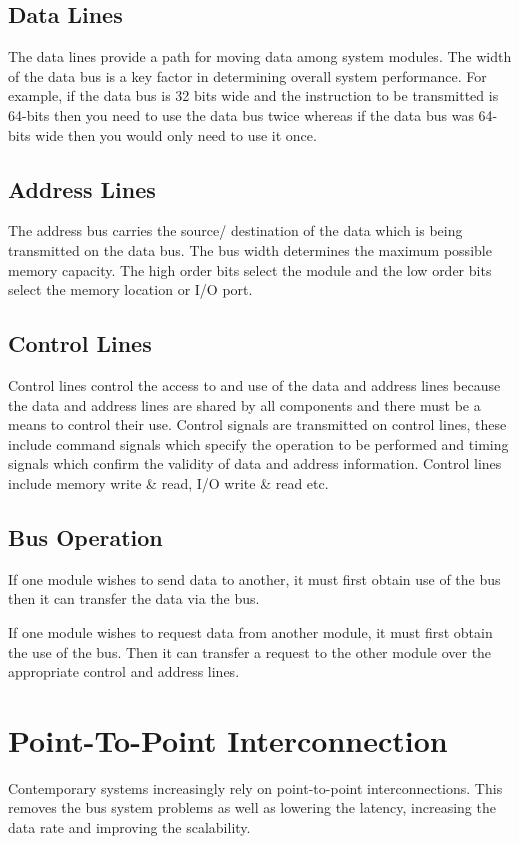 \subsection*{Data Lines}
The data lines provide a path for moving data among system modules. The width of the data bus is a key factor in determining overall system performance. For example, if the data bus is 32 bits wide and the instruction to be transmitted is 64-bits then you need to use the data bus twice whereas if the data bus was 64-bits wide then you would only need to use it once.

\subsection*{Address Lines}
The address bus carries the source/ destination of the data which is being transmitted on the data bus. The bus width determines the maximum possible memory capacity. The high order bits select the module and the low order bits select the memory location or I/O port.

\subsection*{Control Lines}
Control lines control the access to and use of the data and address lines because the data and address lines are shared by all components and there must be a means to control their use. Control signals are transmitted on control lines, these include command signals which specify the operation to be performed and timing signals which confirm the validity of data and address information. Control lines include memory write \& read, I/O write \& read etc.

\subsection*{Bus Operation}
If one module wishes to send data to another, it must first obtain use of the bus then it can transfer the data via the bus.

If one module wishes to request data from another module, it must first obtain the use of the bus. Then it can transfer a request to the other module over the appropriate control and address lines. 

\section*{Point-To-Point Interconnection}
Contemporary systems increasingly rely on point-to-point interconnections. This removes the bus system problems as well as lowering the latency, increasing the data rate and improving the scalability.
